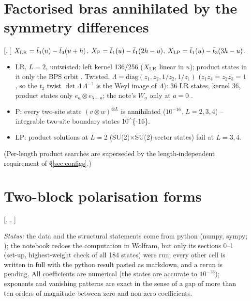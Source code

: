 \section{Factorised bras annihilated by the symmetry differences}\label{sec:fact}

[, ] $X_{\rm LR}=\bar t_1(u)-\bar t_3(u+h)$,
$X_{\rm P}=\bar t_1(u)-\bar t_1(2h-u)$, $X_{\rm LP}=\bar t_1(u)-\bar t_3(3h-u)$.
\begin{itemize}
\item LR, $L=2$, untwisted: left kernel 136/256 ($X_{\rm LR}$ linear in $u$); product states in it only the BPS orbit \ex.
Twisted, $\Lambda=\mathrm{diag}(z_1,z_2,1/z_2,1/z_1)$ ($z_1z_4=z_2z_3=1$, so the $t_3$ twist $\det\Lambda\,\Lambda^{-1}$ is the Weyl
image of $\Lambda$): 36 LR states, kernel 36, product states only $e_a\otimes e_{5-a}$; the note's $W_a$ only at $a=0$ \ex.
\item P: every two-site state $(v\otimes w)^{\otimes L}$ is annihilated ($10^{-16}$, $L=2,3,4$) -- integrable two-site
boundary states \num{10^{-16}}.
\item LP: product solutions at $L=2$ (SU(2)$\times$SU(2)-sector states) fail at $L=3,4$.
\end{itemize}
(Per-length product searches are superseded by the length-independent requirement of \S\ref{sec:configs}.)

\section{Two-block polarisation forms}\label{sec:polforms}

{\raggedright [, , ]\par}
\emph{Status:} the data and the structural statements come from python
(numpy, sympy; \npy); the notebook redoes the computation in Wolfram, but only its sections 0--1 (set-up, highest-weight check of all 184 states) were run; every other cell is written in full with the python result pasted as markdown, and a rerun is pending.
All coefficients are numerical (the states are accurate to $10^{-13}$); exponents and vanishing patterns are exact in the sense of a gap of more than ten orders of magnitude between zero and non-zero coefficients.

